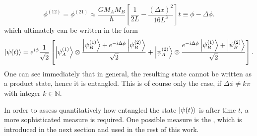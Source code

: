 \begin{equation}\label{eq:2:definition-delta-phi}
  \phi^{(12)} = \phi^{(21)} \approx \frac{GM_AM_B}{\hbar} \left[ \frac{1}{2L} - \frac{(\Delta x)^2}{16 L^3} \right] t \equiv \phi - \Delta\phi .
\end{equation}
which ultimately can be written in the form
\begin{equation}\label{eq:2:evolved-state-factored}
  \ket{\psi(t)} = e^{i\phi}\frac{1}{\sqrt{2}}\left[ 
    \ket{\psi_A^{(1)}} \otimes \frac{\ket{\psi_B^{(1)}} + e^{-i\Delta\phi} \ket{\psi_B^{(2)}}}{\sqrt{2}}
    + \ket{\psi_A^{(2)}} \otimes \frac{e^{-i\Delta\phi} \ket{\psi_B^{(1)}} + \ket{\psi_B^{(2)}}}{\sqrt{2}} \right] .
\end{equation}
One can see immediately that in general, the resulting state cannot be written as a product state, hence it is entangled.
This is of course only the case, if $\Delta \phi \neq k\pi$ with integer $k\in \mathbb{N}$.

In order to assess quantitatively how entangled the state $\ket{\psi(t)}$ is after time $t$, a more sophisticated measure is required. 
One possible measure is the , which is introduced in the next section and used in the rest of this work.